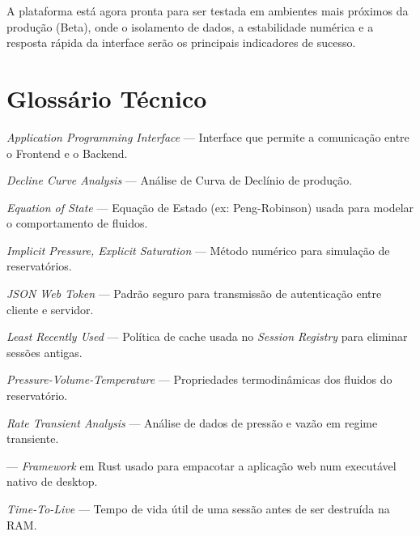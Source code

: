 \documentclass[12pt,a4paper]{article}
\begin{document}
A plataforma está agora pronta para ser testada em ambientes mais próximos da produção (Beta), onde o isolamento de dados, a estabilidade numérica e a resposta rápida da interface serão os principais indicadores de sucesso.

\vspace{0.5cm}
\noindent{}

\vspace{1cm}

\newpage
\section*{Glossário Técnico}

\begin{description}[leftmargin=1em, style=nextline]
    \item[API] \textit{Application Programming Interface} --- Interface que permite a comunicação entre o Frontend e o Backend.
    \item[DCA] \textit{Decline Curve Analysis} --- Análise de Curva de Declínio de produção.
    \item[EOS] \textit{Equation of State} --- Equação de Estado (ex: Peng-Robinson) usada para modelar o comportamento de fluidos.
    \item[IMPES] \textit{Implicit Pressure, Explicit Saturation} --- Método numérico para simulação de reservatórios.
    \item[JWT] \textit{JSON Web Token} --- Padrão seguro para transmissão de autenticação entre cliente e servidor.
    \item[LRU] \textit{Least Recently Used} --- Política de cache usada no \textit{Session Registry} para eliminar sessões antigas.
    \item[PVT] \textit{Pressure-Volume-Temperature} --- Propriedades termodinâmicas dos fluidos do reservatório.
    \item[RTA] \textit{Rate Transient Analysis} --- Análise de dados de pressão e vazão em regime transiente.
    \item[Tauri] --- \textit{Framework} em Rust usado para empacotar a aplicação web num executável nativo de desktop.
    \item[TTL] \textit{Time-To-Live} --- Tempo de vida útil de uma sessão antes de ser destruída na RAM.
\end{description}
\end{document}
